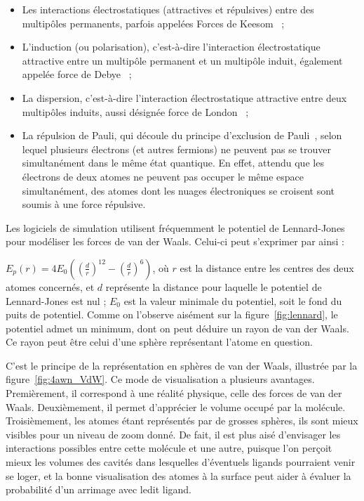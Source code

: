 \begin{appendices}
	\begin{itemize}
	    \item Les interactions électrostatiques (attractives et répulsives) entre des multipôles permanents, parfois appelées Forces de Keesom~\cite{keesom1915second} ;
		\item L'induction (ou polarisation), c'est-à-dire l'interaction électrostatique attractive entre un multipôle permanent et un multipôle induit, également appelée force de Debye~\cite{debye1913reprinted, debye1929polar} ;
	    \item La dispersion, c'est-à-dire l'interaction électrostatique attractive entre deux multipôles induits, aussi désignée force de London~\cite{eisenschitz1930verhaltnis, london1930theorie, london1937general} ;
		\item La répulsion de Pauli, qui découle du principe d'exclusion de Pauli~\cite{pauli1925zusammenhang}, selon lequel plusieurs électrons (et autres fermions) ne peuvent pas se trouver simultanément dans le même état quantique. En effet, attendu que les électrons de deux atomes ne peuvent pas occuper le même espace simultanément, des atomes dont les nuages électroniques se croisent sont soumis à une force répulsive.
	\end{itemize}
	
	Les logiciels de simulation utilisent fréquemment le potentiel de Lennard-Jones~\cite{lennard1924determination} pour modéliser les forces de van der Waals. Celui-ci peut s'exprimer par ainsi :
	
	$E_{p}\left(r\right) = 4E_{0} \left( \left(\frac{d}{r}\right)^{12} - \left(\frac{d}{r}\right)^{6} \right)$, où $r$ est la distance entre les centres des deux atomes concernés, et $d$ représente la distance pour laquelle le potentiel de Lennard-Jones est nul ; $E_{0}$ est la valeur minimale du potentiel, soit le \og fond \fg{} du puits de potentiel. Comme on l'observe aisément sur la figure~\ref{fig:lennard}, le potentiel admet un minimum, dont on peut déduire un rayon de van der Waals. Ce rayon peut être celui d'une sphère représentant l'atome en question.
 
	C'est le principe de la représentation en sphères de van der Waals, illustrée par la figure~\ref{fig:4awn_VdW}. Ce mode de visualisation a plusieurs avantages. Premièrement, il correspond à une réalité physique, celle des forces de van der Waals. Deuxièmement, il permet d'apprécier le volume occupé par la molécule. Troisièmement, les atomes étant représentés par de grosses sphères, ils sont mieux visibles pour un niveau de zoom donné. De fait, il est plus aisé d'envisager les interactions possibles entre cette molécule et une autre, puisque l'on perçoit mieux les volumes des cavités dans lesquelles d'éventuels ligands\footnotemark{} pourraient venir se loger, et la bonne visualisation des atomes à la surface peut aider à évaluer la probabilité d'un arrimage avec ledit ligand.
	

\end{appendices}
